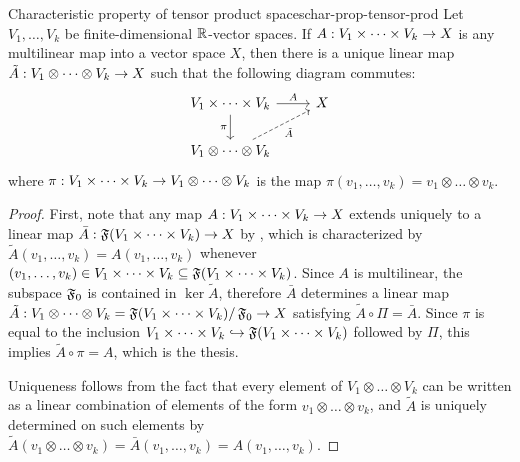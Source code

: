 \begin{theorem}{Characteristic property of tensor product spaces}{char-prop-tensor-prod}
  Let $ V_1 , \dots , V_k $ be finite-dimensional $ \mathbb{R} $-vector spaces. If $ A : V_1 \times \dots \times V_k \rightarrow X $ is any multilinear map into a vector space $ X $, then there is a unique linear map $ \tilde{A} : V_1 \otimes \dots \otimes V_k \rightarrow X $ such that the following diagram commutes:
  \begin{equation}
    \begin{tikzcd}
      V_1 \times \dots \times V_k \ar[r , "A"] \ar[d , "\pi" , swap] & X \\
      V_1 \otimes \dots \otimes V_k \ar[ur , "\tilde{A}" , swap , dashed] &
    \end{tikzcd}
  \end{equation}
  where $ \pi : V_1 \times \dots \times V_k \rightarrow V_1 \otimes \dots \otimes V_k $ is the map $ \pi(v_1 , \dots , v_k) = v_1 \otimes \dots \otimes v_k $.
\end{theorem}

\begin{proofbox}
  \begin{proof}
    First, note that any map $ A : V_1 \times \dots \times V_k \rightarrow X $ extends uniquely to a linear map $ \bar{A} : \operatorname{\mathfrak{F}}(V_1 \times \dots \times V_k) \rightarrow X $ by , which is characterized by $ \tilde{A}(v_1 , \dots , v_k) = A(v_1 , \dots , v_k) $ whenever $ (v_1 , \dots , v_k) \in V_1 \times \dots \times V_k \subseteq \operatorname{\mathfrak{F}}(V_1 \times \dots \times V_k) $. Since $ A $ is multilinear, the subspace $ \operatorname{\mathfrak{F}}_0 $ is contained in $ \ker \tilde{A} $, therefore $ \bar{A} $ determines a linear map $ \tilde{A} : V_1 \otimes \dots \otimes V_k = \operatorname{\mathfrak{F}}(V_1 \times \dots \times V_k) / \operatorname{\mathfrak{F}}_0 \rightarrow X $ satisfying $ \tilde{A} \circ \Pi = \bar{A} $. Since $ \pi $ is equal to the inclusion $ V_1 \times \dots \times V_k \hookrightarrow \operatorname{\mathfrak{F}}(V_1 \times \dots \times V_k) $ followed by $ \Pi $, this implies $ \tilde{A} \circ \pi = A $, which is the thesis.

    Uniqueness follows from the fact that every element of $ V_1 \otimes \dots \otimes V_k $ can be written as a linear combination of elements of the form $ v_1 \otimes \dots \otimes v_k $, and $ \tilde{A} $ is uniquely determined on such elements by $ \tilde{A}(v_1 \otimes \dots \otimes v_k) = \bar{A}(v_1 , \dots , v_k) = A(v_1 , \dots , v_k) $.
  \end{proof}
\end{proofbox}

